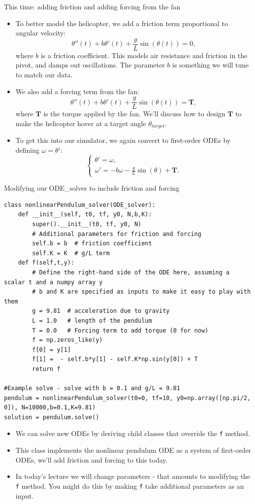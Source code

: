 \documentclass{beamer}
\begin{document}
\begin{frame}{This time: adding friction and adding forcing from the fan}
  \begin{itemize}
    \item To better model the helicopter, we add a friction term proportional to angular velocity:
    \[
      \theta''(t) + b \theta'(t) + \frac{g}{L}\sin(\theta(t)) = 0,
    \]
    where $b$ is a friction coefficient. This models air resistance and friction in the pivot, and damps out oscillations. The parameter $b$ is something we will tune to match our data.
    \item We also add a forcing term from the fan:
    \[
      \theta''(t) + b \theta'(t) + \frac{g}{L}\sin(\theta(t)) = \mathbf{T},
    \]
    where $\mathbf{T}$ is the torque applied by the fan. We'll discuss how to design $\mathbf{T}$ to make the helicopter hover at a target angle $\theta_{target}$.
    \item To get this into our simulator, we again convert to first-order ODEs by defining $\omega = \theta'$:
    \[
      \begin{cases}
        \theta' = \omega, \\
        \omega' = -b\omega -\frac{g}{L}\sin(\theta) + \mathbf{T}.
      \end{cases}
    \]
  \end{itemize}
\end{frame}
  \begin{frame}[fragile]{Modifying our ODE\_solver to include friction and forcing}
    \begin{verbatim}
class nonlinearPendulum_solver(ODE_solver):
    def __init__(self, t0, tf, y0, N,b,K):
        super().__init__(t0, tf, y0, N)
        # Additional parameters for friction and forcing
        self.b = b  # friction coefficient
        self.K = K  # g/L term
    def f(self,t,y):
        # Define the right-hand side of the ODE here, assuming a scalar t and a numpy array y
        # b and K are specified as inputs to make it easy to play with them
        g = 9.81  # acceleration due to gravity
        L = 1.0   # length of the pendulum
        T = 0.0   # Forcing term to add torque (0 for now)
        f = np.zeros_like(y)
        f[0] = y[1]
        f[1] =  - self.b*y[1] - self.K*np.sin(y[0]) + T
        return f

#Example solve - solve with b = 0.1 and g/L = 9.81
pendulum = nonlinearPendulum_solver(t0=0, tf=10, y0=np.array([np.pi/2, 0]), N=10000,b=0.1,K=9.81)
solution = pendulum.solve()
    \end{verbatim}
    \begin{itemize}\small
    \item We can solve new ODEs by deriving child classes that override the \texttt{f} method.
    \item This class implements the nonlinear pendulum ODE as a system of first-order ODEs, we'll add friction and forcing to this today.
    \item In today's lecture we will change parameters - that amounts to modifying the \texttt{f} method. You might do this by making \texttt{f} take additional parameters as an input.
    \end{itemize}
\end{frame}
\end{document}
